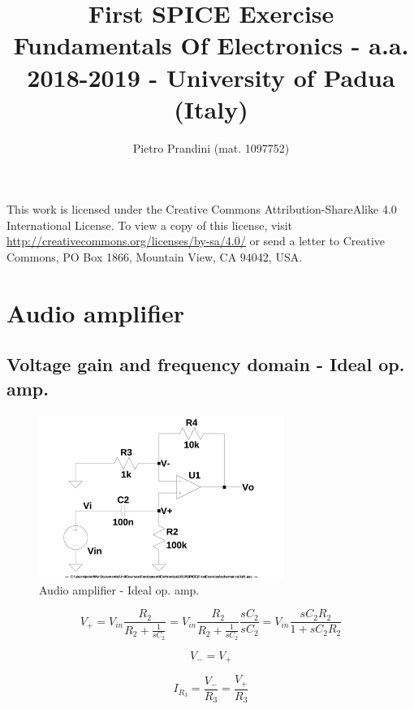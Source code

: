 \documentclass[10pt,a4paper]{article}
\title{First SPICE Exercise\\{\small{Fundamentals Of Electronics - a.a. 2018-2019 -
University of Padua (Italy)}}}
\author{Pietro Prandini (mat. 1097752)}
\begin{document}
\maketitle

\begin{center}
\tiny{This work is licensed under the Creative Commons Attribution-ShareAlike
 4.0 International License. To view a copy of this license, visit
 \href{http://creativecommons.org/licenses/by-sa/4.0/}{http://creativecommons.org/licenses/by-sa/4.0/}
or send a letter to Creative Commons, PO Box 1866, Mountain View, CA 94042,
USA.}
\end{center}

\section{Audio amplifier}
\subsection{Voltage gain and frequency domain - Ideal op. amp.}
\begin{figure}[h]
  \centering
  \includegraphics[width=8cm]{schematics/1d1.jpg}
  \caption{Audio amplifier - Ideal op. amp.}
  \label{1d1schematics}
\end{figure}

\begin{equation} \label{eq:V_+}
V_+ = V_{in}\frac{R_2}{R_2+\frac{1}{sC_2}} =
V_{in}\frac{R_2}{R_2+\frac{1}{sC_2}}\frac{sC_2}{sC_2} =
V_{in}\frac{sC_2R_2}{1+sC_2R_2}
\end{equation}

\begin{equation} \label{eq:V_-}
V_- = V_+
\end{equation}

\begin{equation} \label{eq:I_R3}
I_{R_3} = \frac{V_-}{R_3} = \frac{V_+}{R_3}
\end{equation}
\end{document}
